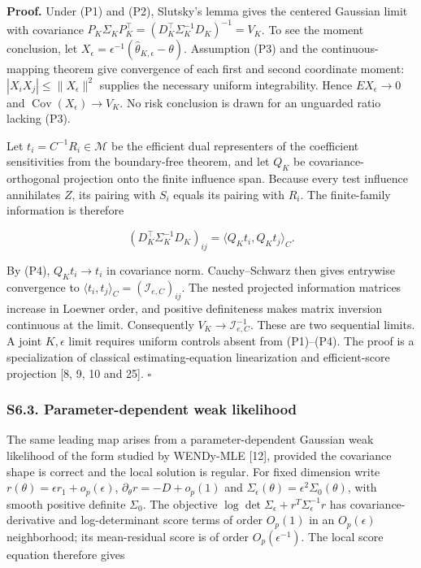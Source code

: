 \documentclass[
  american,
  11pt,
]{article}
\begin{document}
\textbf{Proof.} Under (P1) and (P2), Slutsky's lemma gives the centered
Gaussian limit with covariance
\(P_K\Sigma_KP_K^\top=(D_K^\top\Sigma_K^{-1}D_K)^{-1}=V_K\). To see the
moment conclusion, let
\(X_\epsilon=\epsilon^{-1}(\widehat\theta_{K,\epsilon}-\theta)\).
Assumption (P3) and the continuous-mapping theorem give convergence of
each first and second coordinate moment:
\(|X_iX_j|\leq\|X_\epsilon\|^2\) supplies the necessary uniform
integrability. Hence \(E X_\epsilon\to0\) and
\(\operatorname{Cov}(X_\epsilon)\to V_K\). No risk conclusion is drawn
for an unguarded ratio lacking (P3).

Let \(t_i=C^{-1}R_i\in\mathcal M\) be the efficient dual representers of
the coefficient sensitivities from the boundary-free theorem, and let
\(Q_K\) be covariance-orthogonal projection onto the finite influence
span. Because every test influence annihilates \(Z\), its pairing with
\(S_i\) equals its pairing with \(R_i\). The finite-family information
is therefore

\[
(D_K^\top\Sigma_K^{-1}D_K)_{ij}
=\langle Q_Kt_i,Q_Kt_j\rangle_C.
\]

By (P4), \(Q_Kt_i\to t_i\) in covariance norm. Cauchy--Schwarz then
gives entrywise convergence to
\(\langle t_i,t_j\rangle_C=(\mathcal I_{e,C})_{ij}\). The nested
projected information matrices increase in Loewner order, and positive
definiteness makes matrix inversion continuous at the limit.
Consequently \(V_K\to\mathcal I_{e,C}^{-1}\). These are two sequential
limits. A joint \(K,\epsilon\) limit requires uniform controls absent
from (P1)--(P4). The proof is a specialization of classical
estimating-equation linearization and efficient-score projection {[}8,
9, 10 and 25{]}. \(\square\)

\subsubsection{S6.3. Parameter-dependent weak
likelihood}\label{s6.3.-parameter-dependent-weak-likelihood}

The same leading map arises from a parameter-dependent Gaussian weak
likelihood of the form studied by WENDy-MLE {[}12{]}, provided the
covariance shape is correct and the local solution is regular. For fixed
dimension write \(r(\theta)=\epsilon r_1+o_p(\epsilon)\),
\(\partial_\theta r=-D+o_p(1)\) and
\(\Sigma_\epsilon(\theta)=\epsilon^2\Sigma_0(\theta)\), with smooth
positive definite \(\Sigma_0\). The objective
\(\log\det\Sigma_\epsilon+r^T\Sigma_\epsilon^{-1}r\) has
covariance-derivative and log-determinant score terms of order
\(O_p(1)\) in an \(O_p(\epsilon)\) neighborhood; its mean-residual score
is of order \(O_p(\epsilon^{-1})\). The local score equation therefore
gives
\end{document}
